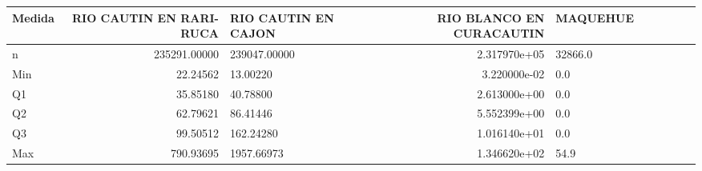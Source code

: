 
\begin{tabular}{l r|l r|l r|l r|l r}
\hline
Medida & RIO CAUTIN EN RARI-RUCA & RIO CAUTIN EN CAJON & RIO BLANCO EN CURACAUTIN & MAQUEHUE\\
\hline
n & 235291.00000 & 239047.00000 & 2.317970e+05 & 32866.0\\
\hline
Min & 22.24562 & 13.00220 & 3.220000e-02 & 0.0\\
\hline
Q1 & 35.85180 & 40.78800 & 2.613000e+00 & 0.0\\
\hline
Q2 & 62.79621 & 86.41446 & 5.552399e+00 & 0.0\\
\hline
Q3 & 99.50512 & 162.24280 & 1.016140e+01 & 0.0\\
\hline
Max & 790.93695 & 1957.66973 & 1.346620e+02 & 54.9\\
\hline
\end{tabular}
